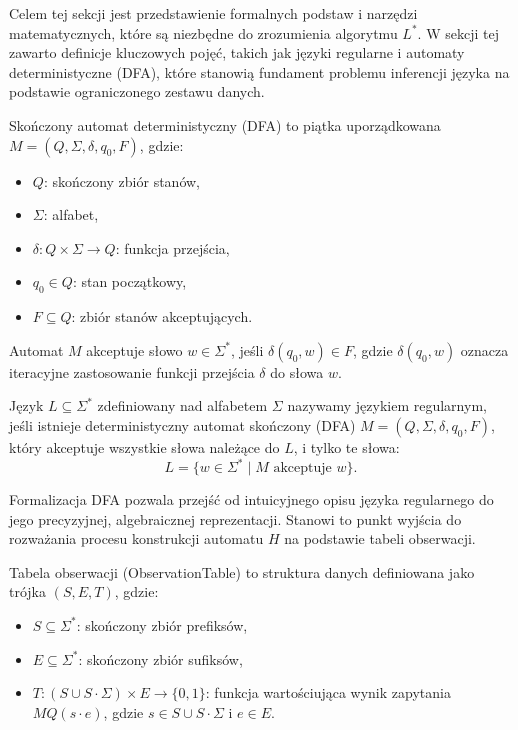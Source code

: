Celem tej sekcji jest przedstawienie formalnych podstaw i narzędzi matematycznych, które są niezbędne do zrozumienia algorytmu \( L^* \). W sekcji tej zawarto definicje kluczowych pojęć, takich jak języki regularne i automaty deterministyczne (DFA), które stanowią fundament problemu inferencji języka na podstawie ograniczonego zestawu danych.

\begin{definition}[DFA]  
    Skończony automat deterministyczny (DFA) to piątka uporządkowana \( M = (Q, \Sigma, \delta, q_0, F) \), gdzie:
    \begin{itemize}
        \item \( Q \): skończony zbiór stanów,
        \item \( \Sigma \): alfabet,
        \item \( \delta: Q \times \Sigma \to Q \): funkcja przejścia,
        \item \( q_0 \in Q \): stan początkowy,
        \item \( F \subseteq Q \): zbiór stanów akceptujących.
    \end{itemize}
\end{definition}

\begin{definition}
    Automat \( M \) akceptuje słowo \( w \in \Sigma^* \), jeśli \( \delta(q_0, w) \in F \), gdzie \( \delta(q_0, w) \) oznacza iteracyjne zastosowanie funkcji przejścia \( \delta \) do słowa \( w \).
\end{definition}

\begin{definition}  
    Język \( L \subseteq \Sigma^* \) zdefiniowany nad alfabetem \( \Sigma \) nazywamy językiem regularnym, jeśli istnieje deterministyczny automat skończony (DFA) \( M = (Q, \Sigma, \delta, q_0, F) \), który akceptuje wszystkie słowa należące do \( L \), i tylko te słowa:
    \[
    L = \{ w \in \Sigma^* \mid M \text{ akceptuje } w \}.
    \]
\end{definition}

Formalizacja DFA pozwala przejść od intuicyjnego opisu języka regularnego do jego precyzyjnej, algebraicznej reprezentacji. Stanowi to punkt wyjścia do rozważania procesu konstrukcji automatu \( H \) na podstawie tabeli obserwacji.

\begin{definition} 
    Tabela obserwacji (ObservationTable) to struktura danych definiowana jako trójka \( (S, E, T) \), gdzie:
    \begin{itemize}
        \item \( S \subseteq \Sigma^* \): skończony zbiór prefiksów,
        \item \( E \subseteq \Sigma^* \): skończony zbiór sufiksów,
        \item \( T: (S \cup S \cdot \Sigma) \times E \to \{0, 1\} \): funkcja wartościująca wynik zapytania \( MQ(s \cdot e) \), gdzie \( s \in S \cup S \cdot \Sigma \) i \( e \in E \).
    \end{itemize}
\end{definition}

